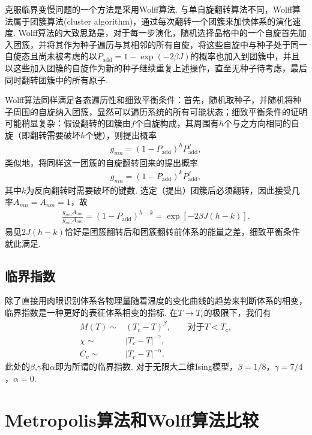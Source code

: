 \documentclass[UTF8,10pt,a4paper]{article}
\theoremstyle{Problem}
\theoremstyle{Solution}
\providecommand{\abs}[1]{\left\lvert#1\right\rvert}
\begin{document}
克服临界变慢问题的一个方法是采用Wolff算法. 与单自旋翻转算法不同，Wolff算法属于团簇算法(cluster algorithm)，通过每次翻转一个团簇来加快体系的演化速度. Wolff算法的大致思路是，对于每一步演化，随机选择晶格中的一个自旋首先加入团簇，并将其作为种子遍历与其相邻的所有自旋，将这些自旋中与种子处于同一自旋态且尚未被考虑的以$P_{\text{add}}=1-\exp(-2\beta J)$的概率也加入到团簇中，并且以这些加入团簇的自旋作为新的种子继续重复上述操作，直至无种子待考虑，最后同时翻转团簇中的所有原子.

Wolff算法同样满足各态遍历性和细致平衡条件：首先，随机取种子，并随机将种子周围的自旋纳入团簇，显然可以遍历系统的所有可能状态；细致平衡条件的证明可能稍显复杂：假设翻转的团簇由$f$个自旋构成，其周围有$h$个与之方向相同的自旋（即翻转需要破坏$h$个键），则提出概率
\begin{align}
    g_{mn}=(1-P_{\text{add}})^hP_{\text{add}}^f,
\end{align}
类似地，将同样这一团簇的自旋翻转回来的提出概率
\begin{align}
    g_{nm}=(1-P_{\text{add}})^kP_{\text{add}}^f,
\end{align}
其中$k$为反向翻转时需要破坏的键数. 选定（提出）团簇后必须翻转，因此接受几率$A_{mn}=A_{nm}=1$，故
\begin{align}
    \frac{g_{mn}A_{mn}}{g_{nm}A_{nm}}=(1-P_{\text{add}})^{h-k}=\exp[-2\beta J(h-k)].
\end{align}
易见$2J(h-k)$恰好是团簇翻转后和团簇翻转前体系的能量之差，细致平衡条件就此满足.

\subsection{临界指数}

除了直接用肉眼识别体系各物理量随着温度的变化曲线的趋势来判断体系的相变，临界指数是一种更好的表征体系相变的指标. 在$T\rightarrow T_c$的极限下，我们有
\begin{align}
    \label{M-T}
    M(T)\sim&(T_c-T)^{\beta},\qquad\text{对于}T<T_c,\\
    \label{chi-T}
    \chi\sim&\abs{T_c-T}^{-\gamma},\\
    \label{C-T}
    C_v\sim&\abs{T_c-T}^{-\alpha}.
\end{align}
此处的$\beta$,$\gamma$和$\alpha$即为所谓的临界指数. 对于无限大二维Ising模型，$\beta=1/8$，$\gamma=7/4$，$\alpha=0$.

\clearpage

\section{Metropolis算法和Wolff算法比较}
\end{document}
